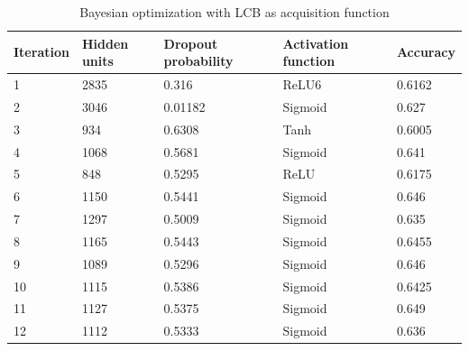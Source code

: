 \documentclass[12pt,fleqn]{article}
\begin{document}
\begin{table}[H]
	\caption{Bayesian optimization with LCB as acquisition function \label{LCB}}
	\centering
	\begin{tabular}{|l|l|l|l|l|}
		\hline
		Iteration & Hidden units & Dropout probability & Activation function & Accuracy \\ \hline
		1 & 2835 & 0.316 & ReLU6 & 0.6162 \\ \hline 
		2 & 3046 & 0.01182 & Sigmoid & 0.627 \\ \hline 
		3 & 934 & 0.6308 & Tanh & 0.6005 \\ \hline 
		4 & 1068 & 0.5681 & Sigmoid & 0.641 \\ \hline 
		5 & 848 & 0.5295 & ReLU & 0.6175 \\ \hline 
		6 & 1150 & 0.5441 & Sigmoid & 0.646 \\ \hline 
		7 & 1297 & 0.5009 & Sigmoid & 0.635 \\ \hline 
		8 & 1165 & 0.5443 & Sigmoid & 0.6455 \\ \hline 
		9 & 1089 & 0.5296 & Sigmoid & 0.646 \\ \hline 
		10 & 1115 & 0.5386 & Sigmoid & 0.6425 \\ \hline 
		11 & 1127 & 0.5375 & Sigmoid & 0.649 \\ \hline 
		12 & 1112 & 0.5333 & Sigmoid & 0.636 \\ \hline 
	\end{tabular}
\end{table}
 
\end{document}
